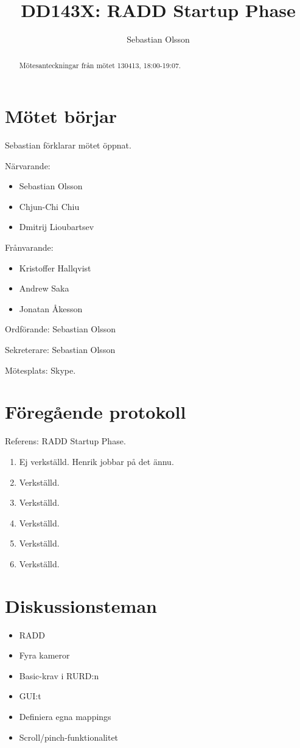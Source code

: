 \documentclass[a4paper,12pt]{article}
\author{Sebastian Olsson}
\title{DD143X: RADD Startup Phase}
\begin{document}
\maketitle
\begin{abstract}
    Mötesanteckningar från mötet 130413, 18:00-19:07.
\end{abstract}

\section{Mötet börjar}
Sebastian förklarar mötet öppnat.

Närvarande:
\begin{itemize}
\item Sebastian Olsson
\item Chjun-Chi Chiu
\item Dmitrij Lioubartsev
\end{itemize}
Frånvarande:
\begin{itemize}
\item Kristoffer Hallqvist
\item Andrew Saka
\item Jonatan Åkesson
\end{itemize}

Ordförande: Sebastian Olsson

Sekreterare: Sebastian Olsson

Mötesplats: Skype.

\section{Föregående protokoll}
Referens: RADD Startup Phase.

\begin{enumerate}
\item Ej verkställd. Henrik jobbar på det ännu.
\item Verkställd.
\item Verkställd.
\item Verkställd.
\item Verkställd.
\item Verkställd.
\end{enumerate}

\section{Diskussionsteman}
\begin{itemize}
\item RADD
\item Fyra kameror
\item Basic-krav i RURD:n
\item GUI:t
\item Definiera egna mappings
\item Scroll/pinch-funktionalitet
\end{itemize}
\end{document}
